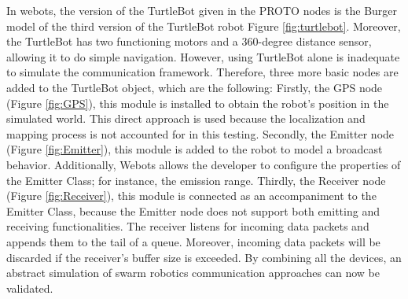 In webots, the version of the TurtleBot given in the PROTO nodes is the Burger model of the third version of the TurtleBot robot Figure \ref{fig:turtlebot}.  Moreover, the TurtleBot has two functioning motors and a 360-degree distance sensor, allowing it to do simple navigation. However, using TurtleBot alone is inadequate to simulate the communication framework. Therefore, three more basic nodes are added to the TurtleBot object, which are the following: Firstly, the GPS node (Figure \ref{fig:GPS}), this module is installed to obtain the robot's position in the simulated world. This direct approach is used because the localization and mapping process is not accounted for in this testing. Secondly, the Emitter node (Figure \ref{fig:Emitter}), this module is added to the robot to model a broadcast behavior. Additionally, Webots allows the developer to configure the properties of the Emitter Class; for instance, the emission range. Thirdly, the Receiver node (Figure \ref{fig:Receiver}), this module is connected as an accompaniment to the Emitter Class, because the Emitter node does not support both emitting and receiving functionalities. The receiver listens for incoming data packets and appends them to the tail of a queue. Moreover, incoming data packets will be discarded if the receiver's buffer size is exceeded. By combining all the devices, an abstract simulation of swarm robotics communication approaches can now be validated.

